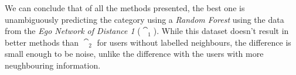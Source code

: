 We can conclude that of all the methods presented, the best one is unambiguously predicting the category using a \emph{Random Forest} using the data from the \emph{Ego Network of Distance 1} ($\cat_1$). While this dataset doesn't result in better methods than $\cat_2$ for users without labelled neighbours, the difference is small enough to be noise, unlike the difference with the users with more neughbouring information.
